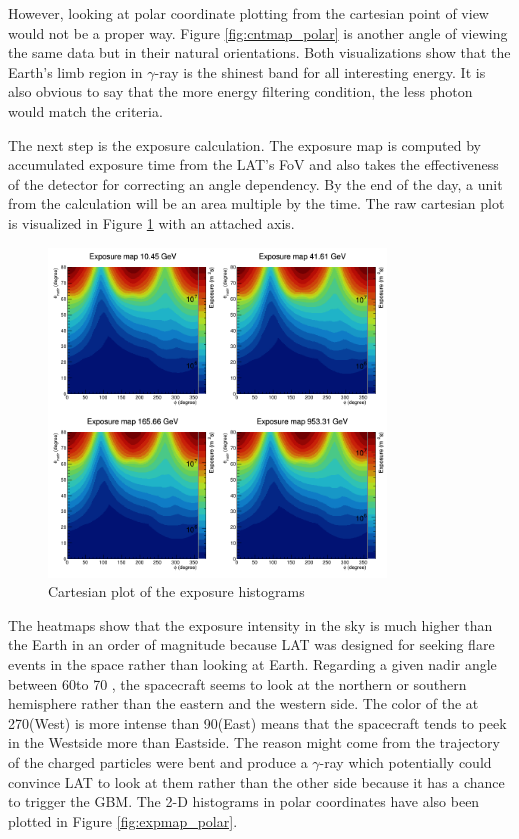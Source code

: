 However, looking at polar coordinate plotting from the cartesian point of view 
would not be a proper way. Figure \ref{fig:cntmap_polar} is another angle of viewing the same data but in their natural orientations.
Both visualizations show that the Earth's limb region in $\gamma$-ray 
is the shinest band for all interesting energy.
It is also obvious to say that the more energy filtering condition,
the less photon would match the criteria.



The next step is the exposure calculation. The exposure map is computed 
by accumulated exposure time from the LAT's FoV and also takes the 
effectiveness of the detector for correcting an angle dependency.
By the end of the day, a unit from the calculation will be an 
area multiple by the time. The raw cartesian plot is visualized in
Figure \ref{fig:expmap_cartesian} with an attached axis.

\begin{figure}[h!]
    \centering
    \includegraphics[width=0.8\textwidth]{content/result_and_discussion/figures/cartesian_expmaps.png}
    \caption{Cartesian plot of the exposure histograms}
    \label{fig:expmap_cartesian}
\end{figure}


The heatmaps show that the exposure intensity in the sky is much
higher than the Earth in an order of magnitude because LAT was designed
for seeking flare events in the space rather than looking at Earth.
Regarding a given nadir angle between 60\textdegree to 70 \textdegree,
the spacecraft seems to look at the northern or southern hemisphere 
rather than the eastern and the western side. The color of the 
at 270\textdegree (West) is more intense than 90\textdegree (East)
means that the spacecraft tends to peek in the Westside more
than Eastside. The reason might come from the trajectory of the charged 
particles were bent and produce a $\gamma$-ray which potentially could 
convince LAT to look at them rather than the other side because it 
has a chance to trigger the GBM.
The 2-D histograms in polar coordinates have also been
plotted in Figure \ref{fig:expmap_polar}.

